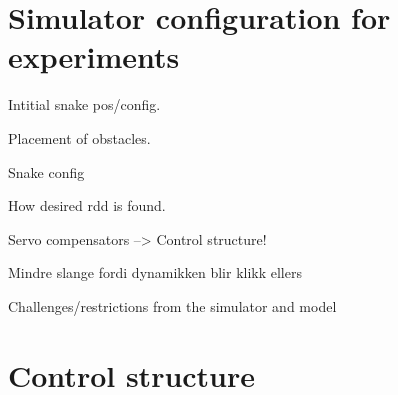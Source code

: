 \section{Simulator configuration for experiments}

Intitial snake pos/config.

Placement of obstacles.

Snake config

How desired rdd is found.

Servo compensators --> Control structure!

Mindre slange fordi dynamikken blir klikk ellers

Challenges/restrictions from the simulator and model

\section{Control structure}